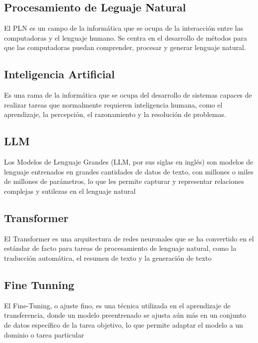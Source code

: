 \documentclass[journal,onecolumn]{IEEEtran}
\begin{document}
	\subsection{Procesamiento de Leguaje Natural}
	El PLN es un campo de la informática que se ocupa de la interacción entre las computadoras y el lenguaje humano. Se centra en el desarrollo de métodos para que las computadoras puedan comprender, procesar y generar lenguaje natural.
	\subsection{Inteligencia Artificial}
	Es una rama de la informática que se ocupa del desarrollo de sistemas capaces de realizar tareas que normalmente requieren inteligencia humana, como el aprendizaje, la percepción, el razonamiento y la resolución de problemas. 
	\subsection{LLM}
	Los Modelos de Lenguaje Grandes (LLM, por sus siglas en inglés) son modelos de lenguaje entrenados en grandes cantidades de datos de texto, con millones o miles de millones de parámetros, lo que les permite capturar y representar relaciones complejas y sutilezas en el lenguaje natural
	\subsection{Transformer}
	El Transformer es una arquitectura de redes neuronales que se ha convertido en el estándar de facto para tareas de procesamiento de lenguaje natural, como la traducción automática, el resumen de texto y la generación de texto
	\subsection{Fine Tunning}
	El Fine-Tuning, o ajuste fino, es una técnica utilizada en el aprendizaje de transferencia, donde un modelo preentrenado se ajusta aún más en un conjunto de datos específico de la tarea objetivo, lo que permite adaptar el modelo a un dominio o tarea particular
\end{document}
